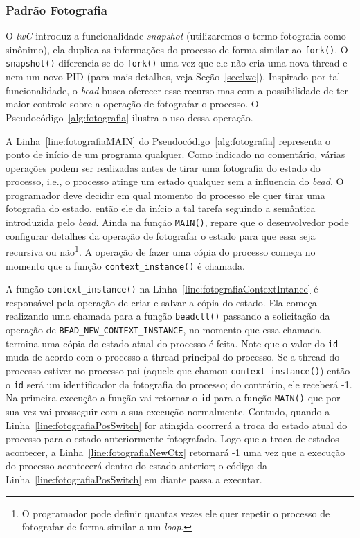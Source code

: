 \subsubsection{Padrão Fotografia}

O \emph{lwC} introduz a funcionalidade \emph{snapshot} (utilizaremos o termo
fotografia como sinônimo), ela duplica as informações do processo de forma
similar ao \texttt{fork()}. O \texttt{snapshot()} diferencia-se do
\texttt{fork()} uma vez que ele não cria uma nova thread e nem um novo PID
(para mais detalhes, veja Seção~\ref{sec:lwc}). Inspirado por tal
funcionalidade, o \emph{bead} busca oferecer esse recurso mas com a
possibilidade de ter maior controle sobre a operação de fotografar o processo.
O Pseudocódigo~\ref{alg:fotografia} ilustra o uso dessa operação.



A Linha~\ref{line:fotografiaMAIN} do Pseudocódigo~\ref{alg:fotografia}
representa o ponto de início de um programa qualquer. Como indicado no
comentário, várias operações podem ser realizadas antes de tirar uma fotografia
do estado do processo, i.e., o processo atinge um estado qualquer sem a
influencia do \emph{bead}. O programador deve decidir em qual momento do
processo ele quer tirar uma fotografia do estado, então ele da início a tal
tarefa seguindo a semântica introduzida pelo \emph{bead}. Ainda na função
\texttt{MAIN()}, repare que o desenvolvedor pode configurar detalhes da
operação de fotografar o estado para que essa seja recursiva ou não\footnote{O
programador pode definir quantas vezes ele quer repetir o processo de
fotografar de forma similar a um \emph{loop}.}. A operação de fazer uma cópia
do processo começa no momento que a função \texttt{context\_instance()} é
chamada.

A função \texttt{context\_instance()} na
Linha~\ref{line:fotografiaContextIntance} é responsável pela operação de criar
e salvar a cópia do estado. Ela começa realizando uma chamada para a função
\texttt{beadctl()} passando a solicitação da operação de
\texttt{BEAD\_NEW\_CONTEXT\_INSTANCE}, no momento que essa chamada termina uma
cópia do estado atual do processo é feita. Note que o valor do \texttt{id} muda
de acordo com o processo a thread principal do processo. Se a thread do processo estiver no
processo pai (aquele que chamou \texttt{context\_instance()}) então o
\texttt{id} será um identificador da fotografia do processo; do contrário, ele
receberá -1. Na primeira execução a função vai retornar o \texttt{id} para a
função \texttt{MAIN()} que por sua vez vai prosseguir com a sua execução
normalmente. Contudo, quando a Linha~\ref{line:fotografiaPosSwitch} for
atingida ocorrerá a troca do estado atual do processo para o estado
anteriormente fotografado. Logo que a troca de estados acontecer, a
Linha~\ref{line:fotografiaNewCtx} retornará -1 uma vez que a execução do
processo acontecerá dentro do estado anterior; o código da
Linha~\ref{line:fotografiaPosSwitch} em diante passa a executar.

